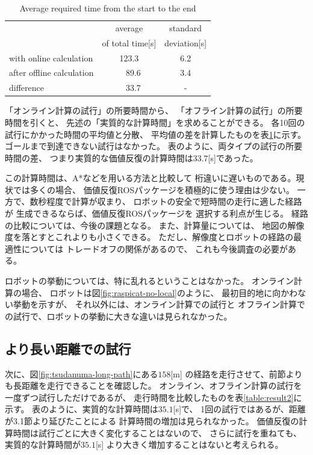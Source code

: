 \documentclass{jarticle}
\begin{document}
\begin{table}[hbtp]
	\caption{Average required time from the start to the end}
	\label{table:result}
	\centering
	\begin{small}
	 \begin{tabular}{l|cc}
		\hline
		 & average & standard \\
		 & of total time[s] & deviation[s] \\
		\hline \hline
		with online calculation & 123.3 & 6.2 \\
		after offline calculation &\ \ 89.6 & 3.4 \\
		\hline
		 difference & \ \ 33.7 & - \\
		\hline
	 \end{tabular}
	\end{small}
\end{table}

「オンライン計算の試行」の所要時間から、
「オフライン計算の試行」の所要時間を引くと、
先述の「実質的な計算時間」を求めることができる。
各10回の試行にかかった時間の平均値と分散、
平均値の差を計算したものを表\ref{table:result}に示す。
ゴールまで到達できない試行はなかった。
表のように、両タイプの試行の所要時間の差、
つまり実質的な価値反復の計算時間は$33.7$[s]であった。

この計算時間は、A*などを用いる方法と比較して
桁違いに遅いものである。現状では多くの場合、
価値反復ROSパッケージを積極的に使う理由は少ない。
一方で、数秒程度で計算が収まり、
ロボットの安全で短時間の走行に適した経路が
生成できるならば、価値反復ROSパッケージを
選択する利点が生じる。
経路の比較については、今後の課題となる。
また、計算量については、
地図の解像度を落とすとこれよりも小さくできる。
ただし、解像度とロボットの経路の最適性については
トレードオフの関係があるので、
これも今後調査の必要がある。

ロボットの挙動については、特に乱れるということはなかった。
オンライン計算の場合、
ロボットは図\ref{fig:raspicat-no-local}のように、
最初目的地に向かわない挙動を示すが、
それ以外には、オンライン計算での試行と
オフライン計算での試行で、ロボットの挙動に大きな違いは見られなかった。


\subsection{より長い距離での試行}

次に、図\ref{fig:tsudanuma-long-path}にある$158$[m]
の経路を走行させて、前節よりも長距離を走行できることを確認した。
オンライン、オフライン計算の試行を一度ずつ試行しただけであるが、
走行時間を比較したものを表\ref{table:result2}に示す。
表のように、実質的な計算時間は$35.1$[s]で、
1回の試行ではあるが、距離が3.1節より延びたことによる
計算時間の増加は見られなかった。
価値反復の計算時間は試行ごとに大きく変化することはないので、
さらに試行を重ねても、実質的な計算時間が$35.1$[s]
より大きく増加することはないと考えられる。
\end{document}
